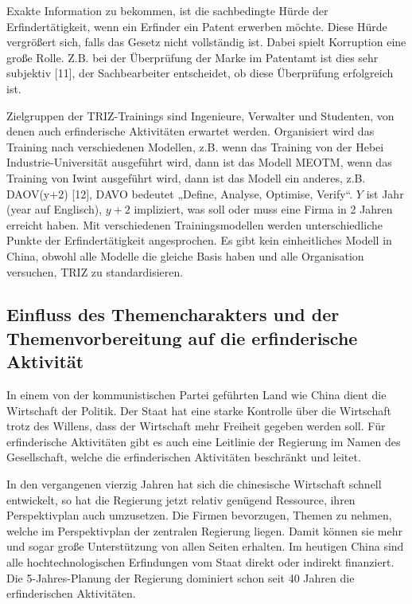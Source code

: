 \documentclass[11pt,a4paper]{article}
\begin{document}
Exakte Information zu bekommen, ist die sachbedingte Hürde der
Erfindertätigkeit, wenn ein Erfinder ein Patent erwerben möchte. Diese Hürde
vergrößert sich, falls das Gesetz nicht vollständig ist. Dabei spielt
Korruption eine große Rolle. Z.B. bei der Überprüfung der Marke im Patentamt
ist dies sehr subjektiv [11], der Sachbearbeiter entscheidet, ob diese
Überprüfung erfolgreich ist.

Zielgruppen der TRIZ-Trainings sind Ingenieure, Verwalter und Studenten, von
denen auch erfinderische Aktivitäten erwartet werden. Organisiert wird das
Training nach verschiedenen Modellen, z.B. wenn das Training von der Hebei
Industrie-Universität ausgeführt wird, dann ist das Modell MEOTM, wenn das
Training von Iwint ausgeführt wird, dann ist das Modell ein anderes, z.B.
DAOV(y+2) [12], DAVO bedeutet „Define, Analyse, Optimise, Verify“.  $Y$ ist
Jahr (year auf Englisch), $y+2$ impliziert, was soll oder muss eine Firma in 2
Jahren erreicht haben. Mit verschiedenen Trainingsmodellen werden
unterschiedliche Punkte der Erfindertätigkeit angesprochen. Es gibt kein
einheitliches Modell in China, obwohl alle Modelle die gleiche Basis haben und
alle Organisation versuchen, TRIZ zu standardisieren.

\subsection{Einfluss des Themencharakters und der Themenvorbereitung auf
  die erfinderische Aktivität} 

In einem von der kommunistischen Partei geführten Land wie China dient die
Wirtschaft der Politik. Der Staat hat eine starke Kontrolle über die
Wirtschaft trotz des Willens, dass der Wirtschaft mehr Freiheit gegeben werden
soll. Für erfinderische Aktivitäten gibt es auch eine Leitlinie der Regierung
im Namen des Gesellschaft, welche die erfinderischen Aktivitäten beschränkt
und leitet.

In den vergangenen vierzig Jahren hat sich die chinesische Wirtschaft schnell
entwickelt, so hat die Regierung jetzt relativ genügend Ressource, ihren
Perspektivplan auch umzusetzen. Die Firmen bevorzugen, Themen zu nehmen,
welche im Perspektivplan der zentralen Regierung liegen. Damit können sie mehr
und sogar große Unterstützung von allen Seiten erhalten. Im heutigen China
sind alle hochtechnologischen Erfindungen vom Staat direkt oder indirekt
finanziert. Die 5-Jahres-Planung der Regierung dominiert schon seit 40 Jahren
die erfinderischen Aktivitäten.
\end{document}
